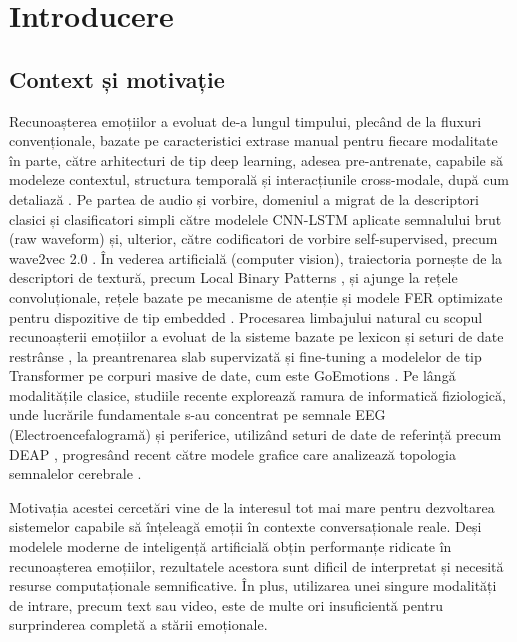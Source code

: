 \documentclass[12pt, a4paper]{article}
\begin{document}
\newpage

\newpage
\tableofcontents
\newpage
{} %


\section{Introducere}

\subsection{Context și motivație}

Recunoașterea emoțiilor a evoluat de-a lungul timpului, plecând de la fluxuri convenționale, bazate pe caracteristici extrase manual pentru fiecare modalitate în parte, către arhitecturi de tip deep learning, adesea pre-antrenate, capabile să modeleze contextul, structura temporală și interacțiunile cross-modale, după cum detaliază \cite{PORIA201798}. Pe partea de audio și vorbire, domeniul a migrat de la descriptori clasici și clasificatori simpli către modelele CNN-LSTM aplicate semnalului brut (raw waveform) \cite{Trigeorgis2016adieu} și, ulterior, către codificatori de vorbire self-supervised, precum wave2vec 2.0 \cite{baevski2020wav2vec}. În vederea artificială (computer vision), traiectoria pornește de la descriptori de textură, precum Local Binary Patterns \cite{shan2009facial}, și ajunge la rețele convoluționale, rețele bazate pe mecanisme de atenție \cite{lideng2018deep} și modele FER optimizate pentru dispozitive de tip embedded \cite{tan2019efficientnet}. Procesarea limbajului natural cu scopul recunoașterii emoțiilor a evoluat de la sisteme bazate pe lexicon și seturi de date restrânse \cite{mohammad2013crowdsourcing}, la preantrenarea slab supervizată și fine-tuning a modelelor de tip Transformer \cite{devlin2018bert} pe corpuri masive de date, cum este GoEmotions \cite{demszky-etal-2020-goemotions}. Pe lângă modalitățile clasice, studiile recente explorează ramura de informatică fiziologică, unde lucrările fundamentale s-au concentrat pe semnale EEG (Electroencefalogramă) și periferice, utilizând seturi de date de referință precum DEAP \cite{Koelstra2012DEAP}, progresând recent către modele grafice care analizează topologia semnalelor cerebrale \cite{Song2020EEGER}.

Motivația acestei cercetări vine de la interesul tot mai mare pentru dezvoltarea sistemelor capabile să înțeleagă emoții în contexte conversaționale reale. Deși modelele moderne de inteligență artificială obțin performanțe ridicate în recunoașterea emoțiilor, rezultatele acestora sunt dificil de interpretat și necesită resurse computaționale semnificative. În plus, utilizarea unei singure modalități de intrare, precum text sau video, este de multe ori insuficientă pentru surprinderea completă a stării emoționale.
\end{document}
